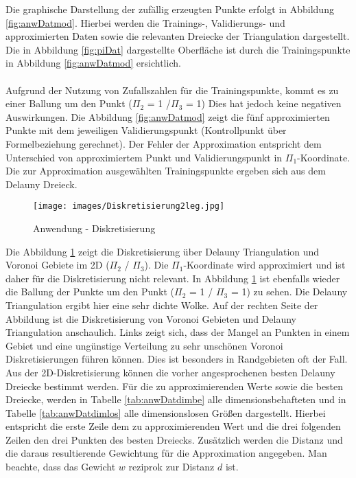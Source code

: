 Die graphische Darstellung der  zufällig erzeugten Punkte erfolgt in Abbildung \ref{fig:anwDatmod}. Hierbei werden die Trainings-, Validierungs- und approximierten Daten sowie die relevanten Dreiecke der Triangulation dargestellt. Die in Abbildung \ref{fig:piDat} dargestellte Oberfläche ist durch die Trainingspunkte in Abbildung \ref{fig:anwDatmod} ersichtlich.\\
\parskip 12pt \\
Aufgrund der Nutzung von Zufallszahlen für die Trainingspunkte, kommt es zu einer Ballung um den Punkt ($\Pi_2$ = 1 /$\Pi_3$ = 1) Dies hat jedoch keine negativen Auswirkungen. Die Abbildung \ref{fig:anwDatmod} zeigt die fünf approximierten Punkte mit dem jeweiligen Validierungspunkt (Kontrollpunkt über  Formelbeziehung gerechnet). Der Fehler der Approximation entspricht dem Unterschied von approximiertem Punkt und Validierungspunkt in $\Pi_1$-Koordinate. Die zur Approximation ausgewählten Trainingspunkte ergeben sich aus dem Delauny Dreieck.
\begin{figure}[h]
	\centering
		\texttt{[image: images/Diskretisierung2leg.jpg]}
	\caption[Anwendung - Diskretisierung]{Anwendung - Diskretisierung}
	\label{fig:anwDisk}
\end{figure}
Die Abbildung \ref{fig:anwDisk} zeigt die Diskretisierung über Delauny Triangulation und Voronoi Gebiete im 2D ($\Pi_2$ / $\Pi_3$). Die $\Pi_1$-Koordinate wird approximiert und ist daher für die Diskretisierung nicht relevant. In Abbildung \ref{fig:anwDisk} ist ebenfalls wieder die Ballung der Punkte um den Punkt {($\Pi_2$ = 1 / $\Pi_3$ = 1)} zu sehen. Die Delauny Triangulation ergibt hier eine sehr dichte Wolke. Auf der rechten Seite der Abbildung ist die Diskretisierung von Voronoi Gebieten und Delauny Triangulation anschaulich. Links zeigt sich, dass der Mangel an Punkten in einem Gebiet und eine ungünstige Verteilung zu sehr unschönen Voronoi Diskretisierungen führen können. Dies  ist besonders in Randgebieten oft der Fall. Aus der 2D-Diskretisierung können die vorher angesprochenen besten Delauny Dreiecke bestimmt werden. Für die zu approximierenden Werte sowie die besten Dreiecke, werden in Tabelle \ref{tab:anwDatdimbe} alle dimensionsbehafteten und in Tabelle \ref{tab:anwDatdimlos} alle dimensionslosen Größen dargestellt. Hierbei entspricht die erste Zeile dem zu approximierenden Wert und die drei folgenden Zeilen den drei Punkten des besten Dreiecks. Zusätzlich werden die Distanz und die daraus resultierende Gewichtung für die Approximation angegeben. Man beachte, dass das Gewicht $w$ reziprok zur Distanz $d$ ist.\\
